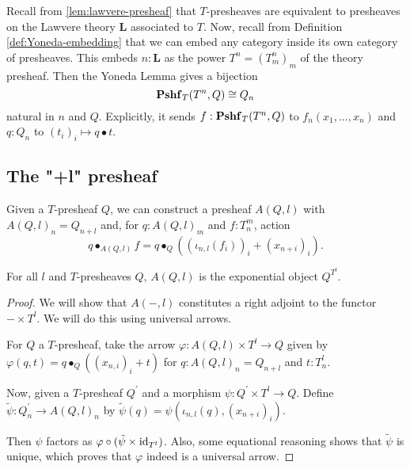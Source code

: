 \begin{remark}\label{rem:presheaf-Yoneda}
  Recall from \ref{lem:lawvere-presheaf} that $ T $-presheaves are equivalent to presheaves on the Lawvere theory $ \mathbf L $ associated to $ T $. Now, recall from Definition \ref{def:Yoneda-embedding} that we can embed any category inside its own category of presheaves. This embeds $ n: \mathbf L $ as the power $ T^n = (T_m^n)_m $ of the theory presheaf. Then the Yoneda Lemma gives a bijection
  \[ \mathbf{Pshf}_{T}(T^n, Q) \cong Q_n \]
  natural in $ n $ and $ Q $. Explicitly, it sends $ f: \mathbf{Pshf}_{T}(T^n, Q) $ to $ f_n(x_1, \dots, x_n) $ and $ q: Q_n $ to $ (t_i)_i \mapsto q \bullet t $.
\end{remark}

\subsection{The "+l" presheaf}

\begin{example}
  Given a $ T $-presheaf $ Q $, we can construct a presheaf $ A(Q, l) $ with $ A(Q, l)_n = Q_{n + l} $ and, for $ q: A(Q, l)_m $ and $ f: T_n^m $, action
  \[ q \bullet_{A(Q, l)} f = q \bullet_Q ((\iota_{n, l} (f_i))_i + (x_{n + i})_i). \]
\end{example}

\begin{lemma}
  For all $ l $ and $ T $-presheaves $ Q $, $ A(Q, l) $ is the exponential object $ Q^{T^l} $.
\end{lemma}
\begin{proof}
  We will show that $ A(-, l) $ constitutes a right adjoint to the functor $ - \times T^l $. We will do this using universal arrows.

  For $ Q $ a $ T $-presheaf, take the arrow $ \varphi: A(Q, l) \times T^l \to Q $ given by $ \varphi(q, t) = q \bullet_Q ((x_{n, i})_i + t) $ for $ q: A(Q, l)_n = Q_{n + l} $ and $ t: T^l_n $.

  Now, given a $ T $-presheaf $ Q^\prime $ and a morphism $ \psi: Q^\prime \times T^l \to Q $. Define $ \tilde \psi: Q^\prime_n \to A(Q, l)_n $ by $ \tilde \psi(q) = \psi(\iota_{n, l}(q), (x_{n + i})_i) $.

  Then $ \psi $ factors as $ \varphi \circ (\tilde \psi \times \text{id}_{T^l}) $. Also, some equational reasoning shows that $ \tilde \psi $ is unique, which proves that $ \varphi $ indeed is a universal arrow.
\end{proof}
